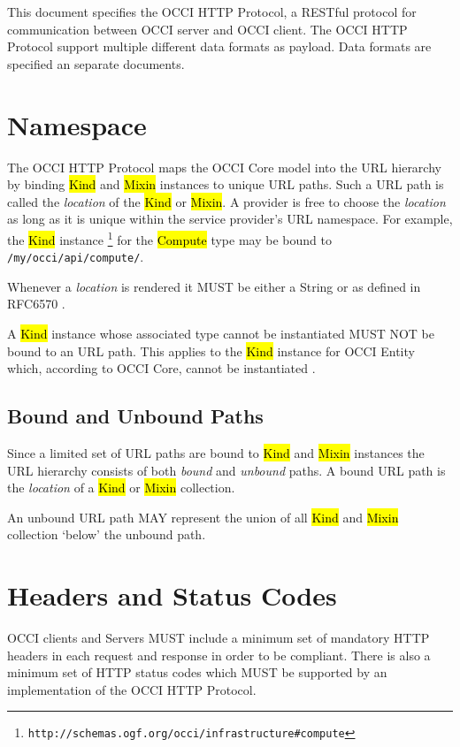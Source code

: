 \documentclass[10pt,a4paper]{article}
\begin{document}
This document specifies the OCCI HTTP Protocol, a RESTful protocol for
communication between OCCI server and OCCI client. The OCCI HTTP Protocol
support multiple different data formats as payload. Data formats are specified
an separate documents.

\section{Namespace}
\label{sec:namspace}

The OCCI HTTP Protocol maps the OCCI Core model into the URL hierarchy by binding
\hl{Kind} and \hl{Mixin} instances to unique URL paths. Such a URL path is called
the {\em location} of the \hl{Kind} or \hl{Mixin}.
A provider is free to choose the {\em location} as long as it is unique
within the service provider's URL namespace.
For example, the \hl{Kind} instance%
\footnote{\tt http://schemas.ogf.org/occi/infrastructure\#compute}
for the \hl{Compute} type may be bound to {\tt /my/occi/api/compute/}.

Whenever a {\em location} is rendered it MUST be either a String or as
defined in RFC6570 \cite{rfc6570}.

A \hl{Kind} instance whose associated type cannot be instantiated MUST NOT be
bound to an URL path. This applies to the \hl{Kind} instance for OCCI Entity
which, according to OCCI Core, cannot be instantiated \cite{occi:core}.

\subsection{Bound and Unbound Paths}

Since a limited set of URL paths are bound to \hl{Kind} and \hl{Mixin}
instances the URL hierarchy consists of both {\em bound} and {\em unbound}
paths.
A bound URL path is the {\em location} of a \hl{Kind} or \hl{Mixin} collection.

An unbound URL path MAY represent the union of all \hl{Kind} and \hl{Mixin}
collection `below' the unbound path.

\section{Headers and Status Codes}
\label{sec:head_stat}

OCCI clients and Servers MUST include a minimum set of mandatory HTTP headers
in each request and response in order to be compliant.
There is also a minimum set of HTTP status codes which MUST be supported by
an implementation of the OCCI HTTP Protocol.
\end{document}
